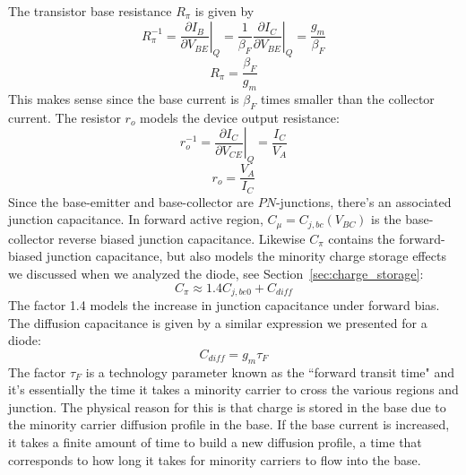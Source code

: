 The transistor base resistance $R_\pi$ is given by
    \begin{equation}
        R_\pi^{-1} = \left. \frac{\partial I_B}{\partial V_{BE}} \right|_Q = \frac{1}{\beta_F} \left. \frac{\partial I_C}{\partial V_{BE}}  \right|_Q = \frac{g_m}{\beta_F}
    \end{equation}
    \begin{equation}
        R_\pi = \frac{\beta_F}{g_m}
    \end{equation}
This makes sense since the base current is $\beta_F$ times smaller than the collector current.  The resistor $r_o$ models the device output resistance: 
    \begin{equation}
        r_o^{-1} = \left. \frac{\partial I_C}{\partial V_{CE}} \right|_Q  = \frac{I_C}{V_A}
    \end{equation}
    \begin{equation}
        r_o = \frac{V_A}{I_C}
    \end{equation}
Since the base-emitter and base-collector are $PN$-junctions, there's an associated junction capacitance.  In forward active region, $C_{\mu} = C_{j,bc}(V_{BC})$ is the base-collector reverse biased junction capacitance.  Likewise $C_\pi$ contains the forward-biased junction capacitance, but also models the minority charge storage effects we discussed when we analyzed the diode, see Section~\ref{sec:charge_storage}:
    \begin{equation}
        C_\pi \approx 1.4 C_{j,be0} + C_{diff}
    \end{equation}
The factor 1.4 models the increase in junction capacitance under forward bias.  The diffusion capacitance is given by a similar expression we presented for a diode:
    \begin{equation}
        C_{diff} = g_m \tau_F 
    \end{equation}
The factor $\tau_F$ is a technology parameter known as the ``forward transit time" and it's essentially the time it takes a minority carrier to cross the various regions and junction.  The physical reason for this is that charge is stored in the base due to the minority carrier diffusion profile in the base.  If the base current is increased, it takes a finite amount of time to build a new diffusion profile, a time that corresponds to how long it takes for minority carriers to flow into the base.
